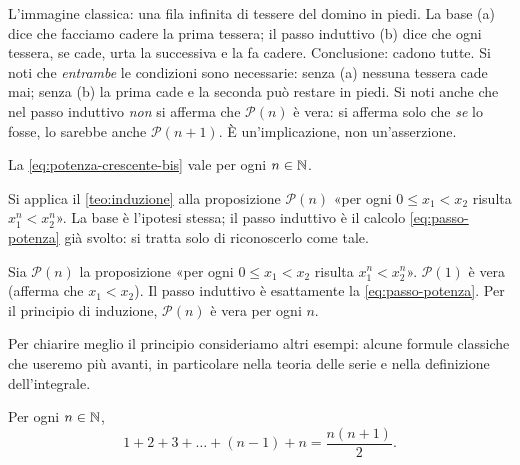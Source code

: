 \begin{idea}
L'immagine classica: una fila infinita di tessere del domino in piedi. La base (a) dice
che facciamo cadere la prima tessera; il passo induttivo (b) dice che ogni tessera, se
cade, urta la successiva e la fa cadere. Conclusione: cadono tutte. Si noti che
\emph{entrambe} le condizioni sono necessarie: senza (a) nessuna tessera cade mai;
senza (b) la prima cade e la seconda può restare in piedi. Si noti anche che nel passo
induttivo \emph{non} si afferma che $\mathcal{P}(n)$ è vera: si afferma solo che
\emph{se} lo fosse, lo sarebbe anche $\mathcal{P}(n+1)$. È un'implicazione, non
un'asserzione.
\end{idea}

\begin{proposizione}\label{prop:induzione-potenza}
La \eqref{eq:potenza-crescente-bis} vale per ogni $n\in\mathbb{N}$.
\end{proposizione}

\begin{schema}
\end{schema}

\begin{strategia}
Si applica il \cref{teo:induzione} alla proposizione $\mathcal{P}(n)$ «per ogni
$0\le x_{1}<x_{2}$ risulta $x_{1}^{n}<x_{2}^{n}$». La base è l'ipotesi stessa; il passo
induttivo è il calcolo \eqref{eq:passo-potenza} già svolto: si tratta solo di
riconoscerlo come tale.
\end{strategia}

\begin{dimostrazione}
Sia $\mathcal{P}(n)$ la proposizione «per ogni $0\le x_{1}<x_{2}$ risulta
$x_{1}^{n}<x_{2}^{n}$». $\mathcal{P}(1)$ è vera (afferma che $x_{1}<x_{2}$). Il passo
induttivo è esattamente la \eqref{eq:passo-potenza}. Per il principio di induzione,
$\mathcal{P}(n)$ è vera per ogni $n$.
\end{dimostrazione}

Per chiarire meglio il principio consideriamo altri esempi: alcune formule classiche
che useremo più avanti, in particolare nella teoria delle serie e nella definizione
dell'integrale.

\begin{proposizione}\label{prop:gauss}
Per ogni $n\in\mathbb{N}$,
\begin{equation}\label{eq:gauss}
  1+2+3+\dots+(n-1)+n=\frac{n(n+1)}{2}.
\end{equation}
\end{proposizione}

